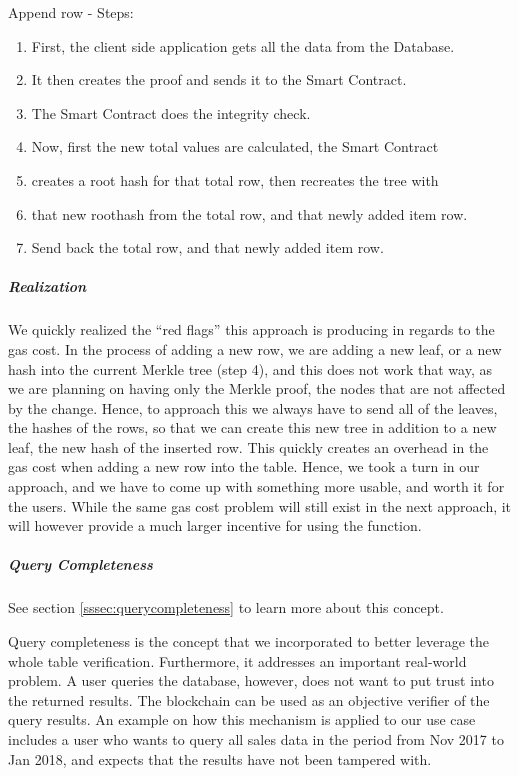 Append row - Steps:
\begin{enumerate}
\item First, the client side application gets all the data from the Database.
\item It then creates the proof and sends it to the Smart Contract.
\item The Smart Contract does the integrity check. 
\item Now, first the new total values are calculated, the Smart Contract 
\item creates a root hash for that total row, then recreates the tree with 
\item that new roothash from the total row, and that newly added item row. 
\item Send back the total row, and that newly added item row. 
\end{enumerate}

\subparagraph{Realization}

We quickly realized the “red flags” this approach is producing in regards to the gas cost. In the process of adding a new row, we are adding a new leaf, or a new hash into the current Merkle tree (step 4), and this does not work that way, as we are planning on having only the Merkle proof, the nodes that are not affected by the change. Hence, to approach this we always have to send all of the leaves, the hashes of the rows, so that we can create this new tree in addition to a new leaf, the new hash of the inserted row. This quickly creates an overhead in the gas cost when adding a new row into the table. Hence, we took a turn in our approach, and we have to come up with something more usable, and worth it for the users. While the same gas cost problem will still exist in the next approach, it will however provide a much larger incentive for using the function. 

\subparagraph{Query Completeness}

See section \ref{sssec:querycompleteness} to learn more about this concept.

Query completeness is the concept that we incorporated to better leverage the whole table verification. Furthermore, it addresses an important real-world problem. A user queries the database, however, does not want to put trust into the returned results. The blockchain can be used as an objective verifier of the query results. An example on how this mechanism is applied to our use case includes a user who wants to query all sales data in the period from Nov 2017 to Jan 2018, and expects that the results have not been tampered with.


